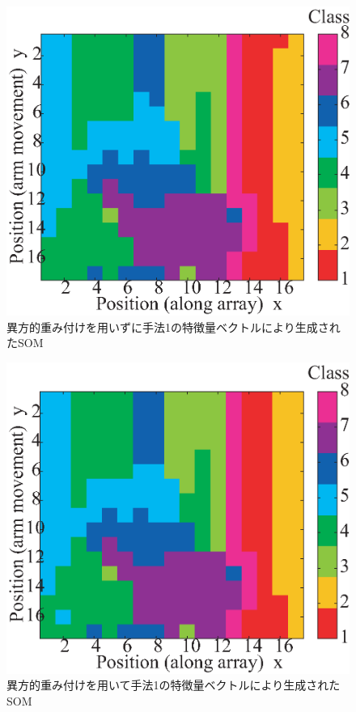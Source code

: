 ﻿\documentclass[12pt,oneside]{jsbook}
\begin{document}
\begin{figure}[btp]
\includegraphics[width =\hsize ]{SOM_170131_wow_wh5_d4.eps}
\caption{異方的重み付けを用いずに手法1の特徴量ベクトルにより生成されたSOM}
\label{vector1-som-wow}
\end{figure}

\begin{figure}[btp]
\includegraphics[width =\hsize ]{SOM_170131_wh5_d4.eps}
\caption{異方的重み付けを用いて手法1の特徴量ベクトルにより生成されたSOM}
\label{vector1-som}
\end{figure}
\end{document}
